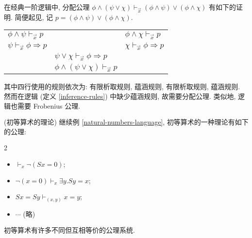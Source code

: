 \begin{example}
	{}
	在经典一阶逻辑中, 分配公理 $\phi\wedge(\psi\vee\chi)\vdash_{\vec{x}}(\phi\wedge\psi)\vee(\phi\wedge\chi)$ 有如下的证明.
	简便起见, 记 $p=(\phi\wedge\psi)\vee(\phi\wedge\chi)$.
	\begin{center}
		\begin{tabular}{lll}
			$\phi\land\psi \vdash_{\vec{x}}  p$&&$\phi\land\chi \vdash_{\vec{x}}  p$  \\ \cline{1-1} \cline{3-3} 
			$\psi \vdash_{\vec{x}} \phi\Rightarrow p$
			&&
			$\chi \vdash_{\vec{x}} \phi\Rightarrow p$
			\\ \hline
			& $\psi\lor\chi \vdash_{\vec{x}} \phi\Rightarrow p$ &  \\ \cline{2-2}
			& $\phi\wedge(\psi\vee\chi)\vdash_{\vec{x}}p$&
		\end{tabular}
	\end{center}
	其中四行使用的规则依次为: 有限析取规则, 蕴涵规则, 有限析取规则, 蕴涵规则. 然而在\coherent{}逻辑 (定义 \ref{inference-rules}) 中缺少蕴涵规则, 故需要分配公理. 类似地, \coherent{}逻辑也需要 Frobenius 公理.
\end{example}

\begin{example}
	{(初等算术的理论)}
	继续例 \ref{natural-numbers-language}, 初等算术的一种理论有如下的公理:
	\begin{multicols*}
		{2}
		\begin{itemize}
			\item $\vdash_x \neg (Sx=0)$;
			\item $\neg(x=0) \vdash_{x} \exists y. Sy=x$;
			\item $Sx=Sy\vdash_{(x,y)} x=y$;
			\item $\cdots$ (略)
		\end{itemize}
	\end{multicols*}
	
	初等算术有许多不同但互相等价的公理系统.
\end{example}

